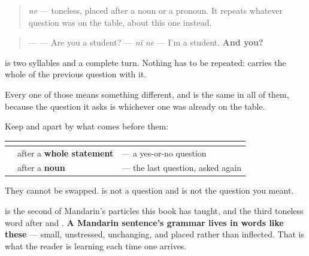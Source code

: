 \begin{grammarlens}[title={Grammar Lens: put \zh{呢} after a noun and it asks the last question again}]
\begin{quote}
\textbf{} \emph{ne} — toneless, placed after a noun or a pronoun. It repeats whatever question was on the table, about this one instead.
\end{quote}

\begin{quote}
— \textbf{} — Are you a student? — \textbf{} \emph{nǐ ne} — I'm a student. \textbf{And you?}
\end{quote}

\textbf{} is two syllables and a complete turn. Nothing has to be repeated:  carries the whole of the previous question with it.

\begin{quote}
\textbf{} \textbf{} \textbf{}
\end{quote}

Every one of those means something different, and  is the same in all of them, because the question it asks is whichever one was already on the table.
\end{grammarlens}

\begin{grammarlens}[title={What you've built — the second particle, and the pair}]
Keep  and  apart by what comes before them:

\noindent
\begin{tabularx}{\linewidth}{@{}>{\raggedright\arraybackslash}X>{\raggedright\arraybackslash}X>{\raggedright\arraybackslash}X@{}}
\toprule
\textbf{} & \textbf{} & \textbf{} \\
\midrule
\textbf{\zh{吗}} & after a \textbf{whole statement} & \zh{你是学生吗} — a yes-or-no question \\
\textbf{\zh{呢}} & after a \textbf{noun} & \zh{你呢} — the last question, asked again \\
\bottomrule
\end{tabularx}

They cannot be swapped. \emph{} is not a question and \emph{} is not the question you meant.

 is the second of Mandarin's particles this book has taught, and the third toneless word after  and . \textbf{A Mandarin sentence's grammar lives in words like these} — small, unstressed, unchanging, and placed rather than inflected. That is what the reader is learning each time one arrives.
\end{grammarlens}

